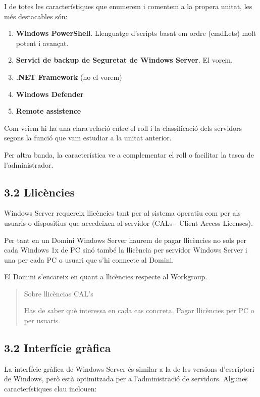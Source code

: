 \documentclass[
  a4paper,
]{article}
\begin{document}
I de totes les característiques que enumerem i comentem a la propera
unitat, les més destacables són:

\begin{enumerate}
\def\labelenumi{\arabic{enumi}.}
\item
  \textbf{Windows PowerShell}. Llenguatge d'scripts basat em ordre
  (cmdLets) molt potent i avançat.
\item
  \textbf{Servici de backup de Seguretat de Windows Server}. El vorem.
\item
  \textbf{.NET Framework} (no el vorem)
\item
  \textbf{Windows Defender}
\item
  \textbf{Remote assistence}
\end{enumerate}

Com veiem hi ha una clara relació entre el roll i la classificació dels
servidors segons la funció que vam estudiar a la unitat anterior.

Per altra banda, la característica ve a complementar el roll o facilitar
la tasca de l'administrador.

\subsection{3.2 Llicències}\label{llicuxe8ncies}

Windows Server requereix llicències tant per al sistema operatiu com per
als usuaris o dispositius que accedeixen al servidor (CALs - Client
Access Licenses).

Per tant en un Domini Windows Server haurem de pagar llicències no sols
per cada Windows 1x de PC sinó també la llicència per servidor Windows
Server i una per cada PC o usuari que s'hi connecte al Domini.

El Domini s'encareix en quant a llicències respecte al Workgroup.

\begin{quote}
Sobre llicèncias CAL's

Has de saber què interessa en cada cas concreta. Pagar llicències per PC
o per usuaris.
\end{quote}

\subsection{3.2 Interfície gràfica}\label{interfuxedcie-gruxe0fica}

La interfície gràfica de Windows Server és similar a la de les versions
d'escriptori de Windows, però està optimitzada per a l'administració de
servidors. Algunes característiques clau inclouen:
\end{document}
